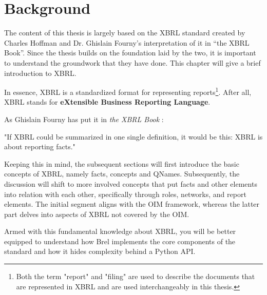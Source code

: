 \section{Background}

The content of this thesis is largely based on the XBRL standard\cite{xbrl} created by Charles Hoffman and Dr. Ghislain Fourny's interpretation of it in ``the XBRL Book''\cite{fourny2023xbrl}.
Since the thesis builds on the foundation laid by the two, it is important to understand the groundwork that they have done.
This chapter will give a brief introduction to XBRL.

In essence, XBRL is a standardized format for representing reports\footnote{Both the term "report" and "filing" are used to describe the documents that are represented in XBRL and are used interchangeably in this thesis.}.
After all, XBRL stands for \textbf{eXtensible Business Reporting Language}.\cite{xbrl}

As Ghislain Fourny has put it in \textit{the XBRL Book} \cite{fourny2023xbrl}:
\begin{displayquote}
    "If XBRL could be summarized in one single definition, it would be this:
    XBRL is about reporting facts."
\end{displayquote}

Keeping this in mind, the subsequent sections will first introduce the basic concepts of XBRL, namely facts, concepts and QNames.
Subsequently, the discussion will shift to more involved concepts that put facts and other elements into relation with each other, 
specifically through roles, networks, and report elements.
The initial segment aligns with the OIM framework, whereas the latter part delves into aspects of XBRL not covered by the OIM.

Armed with this fundamental knowledge about XBRL, 
you will be better equipped to understand how Brel implements the core components of the standard and how it hides complexity behind a Python API.

